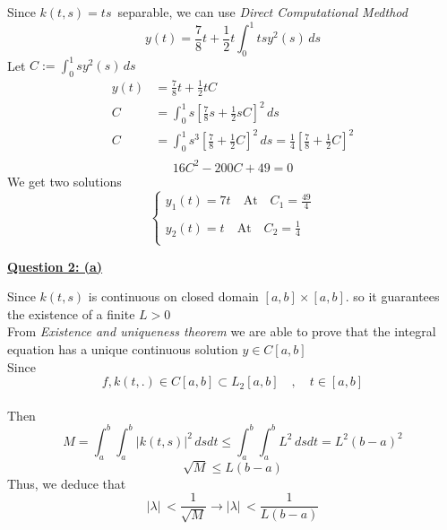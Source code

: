 \documentclass[]{article}
\begin{document}
\begin{adjustwidth}{1cm}{2cm}
    Since $k(t,s)=ts  \,$ separable, we can use \textit{Direct Computational Medthod}\\
    \begin{equation*}
        y(t) = \frac{7}{8}t + \frac{1}{2}t \int_0^1 ts y^2(s) \, ds
    \end{equation*}
    Let $\displaystyle C :=\int_0^1 s y^2(s) \, ds$
    \begin{align*}
        y(t) & = \frac{7}{8}t + \frac{1}{2}tC                                                                                       \\
        C    & = \int_0^1 s \left[\frac{7}{8}s + \frac{1}{2}sC\right]^2 \,ds                                                        \\
        C    & = \int_0^1 s^3 \left[\frac{7}{8} + \frac{1}{2}C\right]^2 \,ds = \frac{1}{4}\left[\frac{7}{8} + \frac{1}{2}C\right]^2 \\
    \end{align*}
    \begin{equation*}
        16C^2 -200C+49=0
    \end{equation*}
    We get two solutions
    \[
        \begin{cases}
            \displaystyle y_1(t) = 7t \quad \text{At} \quad C_1 = \frac{49}{4} \\\\
            \displaystyle y_2(t) = t \quad \text{At}  \quad C_2 = \frac{1}{4}  \\
        \end{cases}
    \]
\end{adjustwidth}
\textbf{\underline{Question 2: (a)}}
\begin{adjustwidth}{1cm}{2cm}
    Since $k(t,s)$ is continuous on closed domain $[a,b]\times[a,b]$. so it guarantees the existence of a finite  $L>0$\\
    From \textit{Existence and uniqueness theorem} we are able to prove that the integral equation has a unique continuous solution $y\in C[a,b]$\\
    Since
    $$f,k(t,.) \in C[a,b] \subset L_2[a,b] \quad,\quad t \in [a,b]$$\\
    Then
    $$M = \int_a^b \int_a^b |k(t,s)|^2 \, ds dt \leq \int_a^b \int_a^b L^2 \, ds dt = L^2 (b-a)^2 $$
    $$\sqrt{M} \leq L(b-a)$$
    Thus, we deduce that
    $$|\lambda|\,< \frac{1}{\sqrt{M}} \rightarrow |\lambda|\,< \frac{1}{L(b-a)}$$
\end{adjustwidth}
\end{document}
